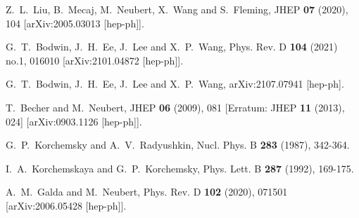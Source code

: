 \documentclass[12pt]{article}
\numberwithin{equation}{section}
\begin{document}
\begin{thebibliography}{99}
Z.~L.~Liu, B.~Mecaj, M.~Neubert, X.~Wang and S.~Fleming,
JHEP \textbf{07} (2020), 104
[arXiv:2005.03013 [hep-ph]].

G.~T.~Bodwin, J.~H.~Ee, J.~Lee and X.~P.~Wang,
Phys. Rev. D \textbf{104} (2021) no.1, 016010
[arXiv:2101.04872 [hep-ph]].

G.~T.~Bodwin, J.~H.~Ee, J.~Lee and X.~P.~Wang,
arXiv:2107.07941 [hep-ph].

T.~Becher and M.~Neubert,
JHEP \textbf{06} (2009), 081
[Erratum: JHEP \textbf{11} (2013), 024]
[arXiv:0903.1126 [hep-ph]].

G.~P.~Korchemsky and A.~V.~Radyushkin,
Nucl. Phys. B \textbf{283} (1987), 342-364.

I.~A.~Korchemskaya and G.~P.~Korchemsky,
Phys. Lett. B \textbf{287} (1992), 169-175.

A.~M.~Galda and M.~Neubert,
Phys. Rev. D \textbf{102} (2020), 071501
[arXiv:2006.05428 [hep-ph]].

\end{thebibliography}
\end{document}
